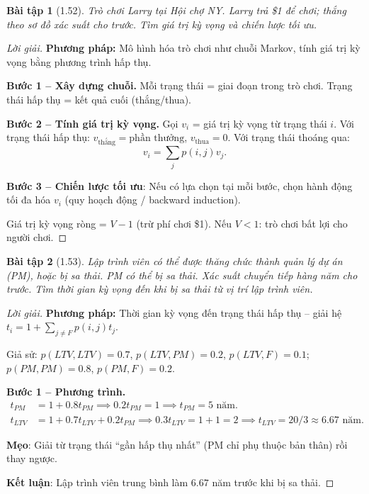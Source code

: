 \documentclass[8pt,a4paper]{article}
\newtheorem{exercise}{Bài tập}
\newenvironment{solution}{\begin{proof}[Lời giải]}{\end{proof}}
\begin{document}
\begin{exercise}[1.52]
Trò chơi Larry tại Hội chợ NY. Larry trả \$1 để chơi; thắng theo sơ đồ xác suất cho trước. Tìm giá trị kỳ vọng và chiến lược tối ưu.
\end{exercise}
\begin{solution}
\textbf{Phương pháp:} Mô hình hóa trò chơi như chuỗi Markov, tính giá trị kỳ vọng bằng phương trình hấp thụ.

\textbf{Bước 1 -- Xây dựng chuỗi.} Mỗi trạng thái = giai đoạn trong trò chơi. Trạng thái hấp thụ = kết quả cuối (thắng/thua).

\textbf{Bước 2 -- Tính giá trị kỳ vọng.}
Gọi $v_i$ = giá trị kỳ vọng từ trạng thái $i$. Với trạng thái hấp thụ: $v_{\text{thắng}} = \text{phần thưởng}$, $v_{\text{thua}} = 0$. Với trạng thái thoáng qua:
\[
  v_i = \sum_j p(i,j) v_j.
\]

\textbf{Bước 3 -- Chiến lược tối ưu}: Nếu có lựa chọn tại mỗi bước, chọn hành động tối đa hóa $v_i$ (quy hoạch động / backward induction).

Giá trị kỳ vọng ròng = $V - 1$ (trừ phí chơi \$1). Nếu $V < 1$: trò chơi bất lợi cho người chơi.
\end{solution}

\begin{exercise}[1.53]
Lập trình viên có thể được thăng chức thành quản lý dự án (PM), hoặc bị sa thải. PM có thể bị sa thải. Xác suất chuyển tiếp hàng năm cho trước. Tìm thời gian kỳ vọng đến khi bị sa thải từ vị trí lập trình viên.
\end{exercise}
\begin{solution}
\textbf{Phương pháp:} Thời gian kỳ vọng đến trạng thái hấp thụ -- giải hệ $t_i = 1 + \sum_{j\neq F} p(i,j) t_j$.

Giả sử: $p(LTV, LTV) = 0.7$, $p(LTV, PM) = 0.2$, $p(LTV, F) = 0.1$; $p(PM, PM) = 0.8$, $p(PM, F) = 0.2$.

\textbf{Bước 1 -- Phương trình.}
\begin{align*}
  t_{PM} &= 1 + 0.8 t_{PM} \implies 0.2 t_{PM} = 1 \implies t_{PM} = 5 \text{ năm.} \\
  t_{LTV} &= 1 + 0.7 t_{LTV} + 0.2 t_{PM} \implies 0.3 t_{LTV} = 1 + 1 = 2 \implies t_{LTV} = 20/3 \approx 6.67 \text{ năm.}
\end{align*}

\textbf{Mẹo}: Giải từ trạng thái ``gần hấp thụ nhất'' (PM chỉ phụ thuộc bản thân) rồi thay ngược.

\textbf{Kết luận}: Lập trình viên trung bình làm $6.67$ năm trước khi bị sa thải.
\end{solution}
\end{document}
